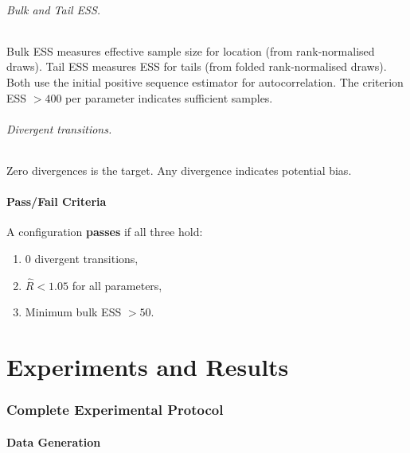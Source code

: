 \documentclass[11pt,a4paper]{article}
\theoremstyle{definition}
\begin{document}
	\paragraph{Bulk and Tail ESS.}
	Bulk ESS measures effective sample size for location (from rank-normalised draws).
	Tail ESS measures ESS for tails (from folded rank-normalised draws).
	Both use the initial positive sequence estimator for autocorrelation.
	The criterion ESS $> 400$ per parameter indicates sufficient samples.
	
	\paragraph{Divergent transitions.}
	Zero divergences is the target.
	Any divergence indicates potential bias.
	
	\subsection{Pass/Fail Criteria}
	\label{sec:pass_fail}
	
	A configuration \textbf{passes} if all three hold:
	\begin{enumerate}[nosep]
		\item 0 divergent transitions,
		\item $\hat{R} < 1.05$ for all parameters,
		\item Minimum bulk ESS $> 50$.
	\end{enumerate}
	
	
	
	\part{Experiments and Results}
	
	\section{Complete Experimental Protocol}
	\label{sec:protocol}
	
	\subsection{Data Generation}
	\label{sec:datagen}
	
\end{document}
